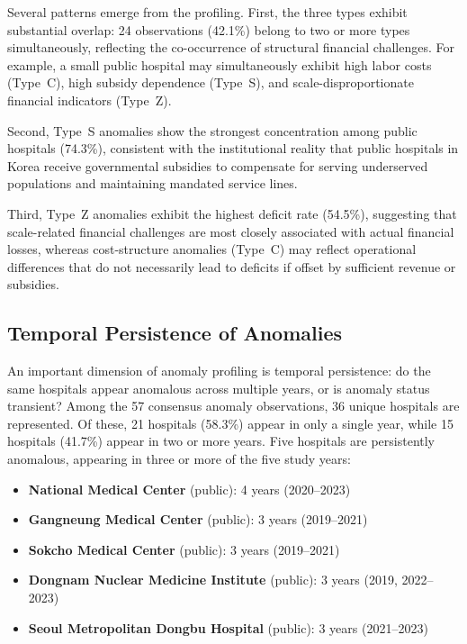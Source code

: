 \documentclass{ieeeaccess}
\begin{document}
Several patterns emerge from the profiling. First, the three types exhibit substantial overlap: 24 observations (42.1\%) belong to two or more types simultaneously, reflecting the co-occurrence of structural financial challenges. For example, a small public hospital may simultaneously exhibit high labor costs (Type~C), high subsidy dependence (Type~S), and scale-disproportionate financial indicators (Type~Z).

Second, Type~S anomalies show the strongest concentration among public hospitals (74.3\%), consistent with the institutional reality that public hospitals in Korea receive governmental subsidies to compensate for serving underserved populations and maintaining mandated service lines.

Third, Type~Z anomalies exhibit the highest deficit rate (54.5\%), suggesting that scale-related financial challenges are most closely associated with actual financial losses, whereas cost-structure anomalies (Type~C) may reflect operational differences that do not necessarily lead to deficits if offset by sufficient revenue or subsidies.

\subsection{Temporal Persistence of Anomalies}
\label{subsec:persistence}

An important dimension of anomaly profiling is temporal persistence: do the same hospitals appear anomalous across multiple years, or is anomaly status transient? Among the 57 consensus anomaly observations, 36 unique hospitals are represented. Of these, 21 hospitals (58.3\%) appear in only a single year, while 15 hospitals (41.7\%) appear in two or more years. Five hospitals are persistently anomalous, appearing in three or more of the five study years:

\begin{itemize}
    \item \textbf{National Medical Center} (public): 4 years (2020--2023)
    \item \textbf{Gangneung Medical Center} (public): 3 years (2019--2021)
    \item \textbf{Sokcho Medical Center} (public): 3 years (2019--2021)
    \item \textbf{Dongnam Nuclear Medicine Institute} (public): 3 years (2019, 2022--2023)
    \item \textbf{Seoul Metropolitan Dongbu Hospital} (public): 3 years (2021--2023)
\end{itemize}
\end{document}
